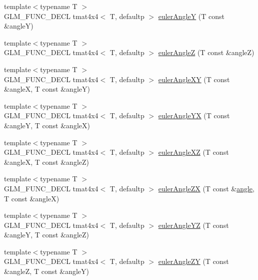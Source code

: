 \begin{DoxyCompactItemize}
\item 
{\footnotesize template$<$typename T $>$ }\\G\+L\+M\+\_\+\+F\+U\+N\+C\+\_\+\+D\+E\+C\+L tmat4x4$<$ T, defaultp $>$ \hyperlink{group__gtx__euler__angles_gaeb193af1184bdf39c23636d756e1ff33}{euler\+Angle\+Y} (T const \&angle\+Y)
\item 
{\footnotesize template$<$typename T $>$ }\\G\+L\+M\+\_\+\+F\+U\+N\+C\+\_\+\+D\+E\+C\+L tmat4x4$<$ T, defaultp $>$ \hyperlink{group__gtx__euler__angles_gab59c4fe7f735568255cc19fddd3ddfcd}{euler\+Angle\+Z} (T const \&angle\+Z)
\item 
{\footnotesize template$<$typename T $>$ }\\G\+L\+M\+\_\+\+F\+U\+N\+C\+\_\+\+D\+E\+C\+L tmat4x4$<$ T, defaultp $>$ \hyperlink{group__gtx__euler__angles_ga8bf84f92ca976a7f50dbe4b30ceb72dd}{euler\+Angle\+X\+Y} (T const \&angle\+X, T const \&angle\+Y)
\item 
{\footnotesize template$<$typename T $>$ }\\G\+L\+M\+\_\+\+F\+U\+N\+C\+\_\+\+D\+E\+C\+L tmat4x4$<$ T, defaultp $>$ \hyperlink{group__gtx__euler__angles_gafdd02f9a37511190962119adef5c1c25}{euler\+Angle\+Y\+X} (T const \&angle\+Y, T const \&angle\+X)
\item 
{\footnotesize template$<$typename T $>$ }\\G\+L\+M\+\_\+\+F\+U\+N\+C\+\_\+\+D\+E\+C\+L tmat4x4$<$ T, defaultp $>$ \hyperlink{group__gtx__euler__angles_gab2d7dc94b9a7519d741aaa208c7a335b}{euler\+Angle\+X\+Z} (T const \&angle\+X, T const \&angle\+Z)
\item 
{\footnotesize template$<$typename T $>$ }\\G\+L\+M\+\_\+\+F\+U\+N\+C\+\_\+\+D\+E\+C\+L tmat4x4$<$ T, defaultp $>$ \hyperlink{group__gtx__euler__angles_gaef83cf40bd9ae780011b29970f16f622}{euler\+Angle\+Z\+X} (T const \&\hyperlink{group__gtc__quaternion_gad4a4448baedb198b2b1e7880d2544dc9}{angle}, T const \&angle\+X)
\item 
{\footnotesize template$<$typename T $>$ }\\G\+L\+M\+\_\+\+F\+U\+N\+C\+\_\+\+D\+E\+C\+L tmat4x4$<$ T, defaultp $>$ \hyperlink{group__gtx__euler__angles_ga1033f84f51d61646145352ef0c1bb58c}{euler\+Angle\+Y\+Z} (T const \&angle\+Y, T const \&angle\+Z)
\item 
{\footnotesize template$<$typename T $>$ }\\G\+L\+M\+\_\+\+F\+U\+N\+C\+\_\+\+D\+E\+C\+L tmat4x4$<$ T, defaultp $>$ \hyperlink{group__gtx__euler__angles_ga02f037926568bbd12dfece3b28b20343}{euler\+Angle\+Z\+Y} (T const \&angle\+Z, T const \&angle\+Y)

\end{DoxyCompactItemize}
